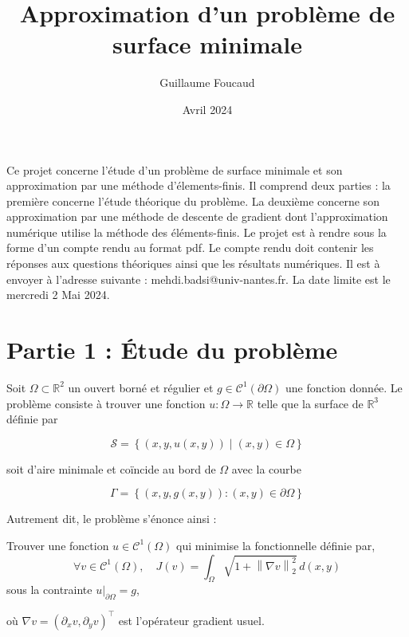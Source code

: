 \documentclass{article}
\title{Approximation d'un problème de surface minimale}
\author{Guillaume Foucaud}
\date{Avril 2024}
\newcommand{\Real}{ \mathbb{R} }
\newcommand{\Set}[1]{ \left\{ #1 \right\} }
\newcommand{\FunctionClass}[2]{ \mathcal{C}^{#1} \left( #2 \right) }
\newcommand{\FunctionWithSqrt}[1]{ \sqrt{1 + #1 ^2} }
\newcommand{\Norm}[2]{ \left\| #1 \right\|_{#2} }
\begin{document}
\maketitle

Ce projet concerne l’étude d’un problème de surface minimale et
son approximation par une méthode d’élements-finis. Il comprend deux parties : la
première concerne l’étude théorique du problème. La deuxième concerne son approximation
par une méthode de descente de gradient dont l’approximation numérique
utilise la méthode des éléments-finis.
Le projet est à rendre sous la forme d’un compte rendu au format pdf. Le compte
rendu doit contenir les réponses aux questions théoriques ainsi que les résultats numériques.
Il est à envoyer à l’adresse suivante : mehdi.badsi@univ-nantes.fr. La date
limite est le mercredi 2 Mai 2024.

\section{Partie 1 : Étude du problème}

Soit $\Omega \subset \Real^2$ un ouvert borné et régulier et $g \in \FunctionClass{1}{\partial \Omega}$ une fonction donnée. Le problème consiste à trouver une fonction $u : \Omega \rightarrow \Real$ telle que la surface de $\Real^3$ définie par

$$\mathcal{S} = \Set{(x, y, u(x, y)) \mid (x, y) \in \Omega}$$
\newline

soit d'aire minimale et coïncide au bord de $\Omega$ avec la courbe

$$\Gamma = \Set{(x, y, g(x, y)) : (x, y) \in \partial \Omega}$$

Autrement dit, le problème s'énonce ainsi :
\newline

Trouver une fonction $u \in \FunctionClass{1}{\Omega}$ qui minimise la fonctionnelle définie par,
$$
\forall v \in \FunctionClass{1}{\Omega}, \quad J(v) = \int_{\Omega} \FunctionWithSqrt{\Norm{\nabla v}{2}} \, d(x,y)
$$
sous la contrainte $u|_{\partial \Omega} = g$,

où $\nabla v = (\partial_x v, \partial_y v)^\top$ est l'opérateur gradient usuel.

\end{document}
